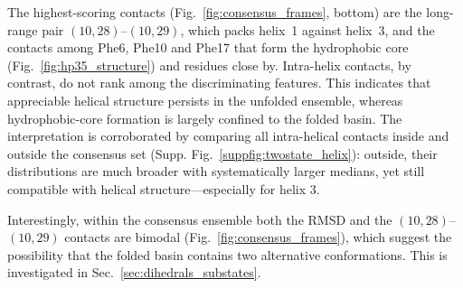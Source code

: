 \documentclass[prl,twocolumn]{revtex4-1}
\begin{document}
The highest-scoring contacts (Fig.~\ref{fig:consensus_frames}, bottom) are the long-range pair $(10,28)$--$(10,29)$, which packs helix~1 against helix~3, and the contacts among Phe6, Phe10 and Phe17 that form the hydrophobic core (Fig.~\ref{fig:hp35_structure}) and residues close by. Intra-helix contacts, by contrast, do not rank among the discriminating features. This indicates that appreciable helical structure persists in the unfolded ensemble, whereas hydrophobic-core formation is largely confined to the folded basin. The interpretation is corroborated by comparing all intra-helical contacts inside and outside the consensus set (Supp. Fig.~\ref{suppfig:twostate_helix}): outside, their distributions are much broader with systematically larger medians, yet still compatible with helical structure—especially for helix $3$.

Interestingly, within the consensus ensemble both the RMSD and the $(10,28)$--$(10,29)$ contacts are bimodal (Fig.~\ref{fig:consensus_frames}), which suggest the possibility that the folded basin contains two alternative conformations. This is investigated in Sec.~\ref{sec:dihedrals_substates}. 
\end{document}
